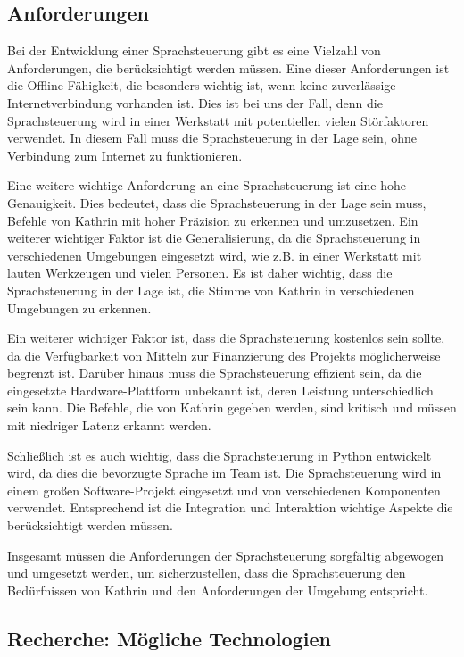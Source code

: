 \documentclass[../main.tex]{subfiles}
\begin{document}
\subsection{Anforderungen}

Bei der Entwicklung einer Sprachsteuerung gibt es eine Vielzahl von Anforderungen, die berücksichtigt werden müssen. Eine dieser Anforderungen ist die Offline-Fähigkeit, die besonders wichtig ist, wenn keine zuverlässige Internetverbindung vorhanden ist. Dies ist bei uns der Fall, denn die Sprachsteuerung wird in einer Werkstatt mit potentiellen vielen Störfaktoren verwendet. In diesem Fall muss die Sprachsteuerung in der Lage sein, ohne Verbindung zum Internet zu funktionieren.

Eine weitere wichtige Anforderung an eine Sprachsteuerung ist eine hohe Genauigkeit. Dies bedeutet, dass die Sprachsteuerung in der Lage sein muss, Befehle von Kathrin mit hoher Präzision zu erkennen und umzusetzen. Ein weiterer wichtiger Faktor ist die Generalisierung, da die Sprachsteuerung in verschiedenen Umgebungen eingesetzt wird, wie z.B. in einer Werkstatt mit lauten Werkzeugen und vielen Personen. Es ist daher wichtig, dass die Sprachsteuerung in der Lage ist, die Stimme von Kathrin in verschiedenen Umgebungen zu erkennen.

Ein weiterer wichtiger Faktor ist, dass die Sprachsteuerung kostenlos sein sollte, da die Verfügbarkeit von Mitteln zur Finanzierung des Projekts möglicherweise begrenzt ist. Darüber hinaus muss die Sprachsteuerung effizient sein, da die eingesetzte Hardware-Plattform unbekannt ist, deren Leistung unterschiedlich sein kann. Die Befehle, die von Kathrin gegeben werden, sind kritisch und müssen mit niedriger Latenz erkannt werden.

Schließlich ist es auch wichtig, dass die Sprachsteuerung in Python entwickelt wird, da dies die bevorzugte Sprache im Team ist. Die Sprachsteuerung wird in einem großen Software-Projekt eingesetzt und von verschiedenen Komponenten verwendet. Entsprechend ist die Integration und Interaktion wichtige Aspekte die berücksichtigt werden müssen.

Insgesamt müssen die Anforderungen der Sprachsteuerung sorgfältig abgewogen und umgesetzt werden, um sicherzustellen, dass die Sprachsteuerung den Bedürfnissen von Kathrin und den Anforderungen der Umgebung entspricht.

\subsection{Recherche: Mögliche Technologien}
\end{document}
